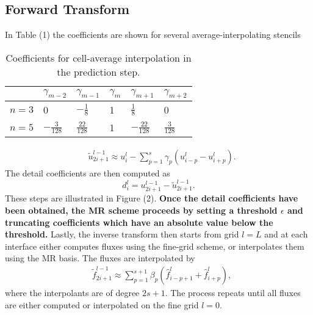 \documentclass{article}
\begin{document}
\subsection{Forward Transform}

In Table (1) the coefficients are shown for several average-interpolating stencils
\begin{table}
    \centering
    \begin{tabular}{|l|l|l|l|l|l|}
    \hline
      & $\gamma_{m-2}$   & $\gamma_{m-1}$   & $\gamma_{m}$ & $\gamma_{m+1}$    & $\gamma_{m+2}$  \\ \hline
    $n=3$ & 0                & $-\frac{1}{8}$   & 1            & $\frac{1}{8}$     & 0               \\ \hline
    $n=5$ & $-\frac{3}{128}$ & $\frac{22}{128}$ & 1            & $-\frac{22}{128}$ & $\frac{3}{128}$ \\ \hline
    \end{tabular}
    \caption{Coefficients for cell-average interpolation in the prediction step.}
\end{table}

\begin{align}
    & \tilde{u}_{2i+1}^{l-1} \approx u_{i}^{l} - \sum_{p=1}^{s} \gamma_{p} \left( u^{l}_{i-p} - u^{l}_{i+p} \right).
\end{align}
The detail coefficients are then computed as
\begin{equation}
    d^{l}_{i} = u^{l-1}_{2i+1} - \tilde{u}^{l-1}_{2i+1}.
\end{equation}
These steps are illustrated in Figure (2). \textbf{Once the detail coefficients have been obtained, the MR scheme proceeds by setting a threshold $\epsilon$ and truncating coefficients which have an absolute value below the threshold.} Lastly, the inverse transform then starts from grid $l=L$ and at each interface either computes fluxes using the fine-grid scheme, or interpolates them using the MR basis. The fluxes are interpolated by
\begin{align}
    & \tilde{f}_{2i+1}^{l-1} \approx \sum_{p=1}^{s+1} \beta_{p} \left( \hat{f}^{l}_{i-p+1} + \hat{f}^{l}_{i+p} \right),
\end{align}
where the interpolants are of degree $2s+1$. The process repeats until all fluxes are either computed or interpolated on the fine grid $l=0$.
\end{document}
